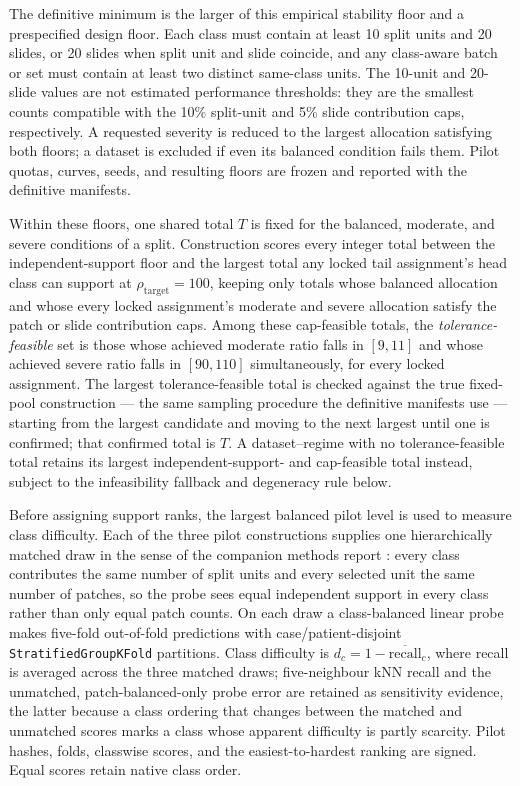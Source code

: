 \documentclass[11pt]{article}
\begin{document}
The definitive minimum is the larger of this empirical stability floor and a prespecified design floor. Each class must contain at least 10 split units and 20 slides, or 20 slides when split unit and slide coincide, and any class-aware batch or set must contain at least two distinct same-class units. The 10-unit and 20-slide values are not estimated performance thresholds: they are the smallest counts compatible with the 10\% split-unit and 5\% slide contribution caps, respectively. A requested severity is reduced to the largest allocation satisfying both floors; a dataset is excluded if even its balanced condition fails them. Pilot quotas, curves, seeds, and resulting floors are frozen and reported with the definitive manifests.

Within these floors, one shared total $T$ is fixed for the balanced, moderate, and severe conditions of a split. Construction scores every integer total between the independent-support floor and the largest total any locked tail assignment's head class can support at $\rho_{\mathrm{target}}=100$, keeping only totals whose balanced allocation and whose every locked assignment's moderate and severe allocation satisfy the patch or slide contribution caps. Among these cap-feasible totals, the \emph{tolerance-feasible} set is those whose achieved moderate ratio falls in $[9,11]$ and whose achieved severe ratio falls in $[90,110]$ simultaneously, for every locked assignment. The largest tolerance-feasible total is checked against the true fixed-pool construction --- the same sampling procedure the definitive manifests use --- starting from the largest candidate and moving to the next largest until one is confirmed; that confirmed total is $T$. A dataset--regime with no tolerance-feasible total retains its largest independent-support- and cap-feasible total instead, subject to the infeasibility fallback and degeneracy rule below.

Before assigning support ranks, the largest balanced pilot level is used to measure class difficulty. Each of the three pilot constructions supplies one hierarchically matched draw in the sense of the companion methods report \citep{queisler2026imbalanceMethods}: every class contributes the same number of split units and every selected unit the same number of patches, so the probe sees equal independent support in every class rather than only equal patch counts. On each draw a class-balanced linear probe makes five-fold out-of-fold predictions with case/patient-disjoint \texttt{StratifiedGroupKFold} partitions. Class difficulty is $d_c=1-\overline{\mathrm{recall}}_c$, where recall is averaged across the three matched draws; five-neighbour kNN recall and the unmatched, patch-balanced-only probe error are retained as sensitivity evidence, the latter because a class ordering that changes between the matched and unmatched scores marks a class whose apparent difficulty is partly scarcity. Pilot hashes, folds, classwise scores, and the easiest-to-hardest ranking are signed. Equal scores retain native class order.
\end{document}
